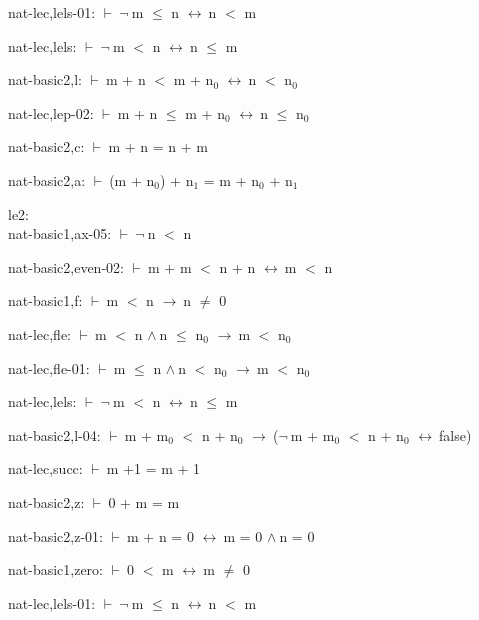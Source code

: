 \documentclass[a4paper]{article}
\newcommand{\Fol}{\mbox{$\vdash\ $}}
\newcommand{\Not}{\mbox{$\neg\ $}}
\newcommand{\And}{\mbox{$\wedge\ $}}
\newcommand{\Imp}{\mbox{$\rightarrow\ $}}
\newcommand{\Equiv}{\mbox{$\leftrightarrow\ $}}
\begin{document}
nat-lec,lels-01: 
 \Fol \Not m $\le$ n \Equiv n $<$ m



nat-lec,lels: 
 \Fol \Not m $<$ n \Equiv n $\le$ m



nat-basic2,l: 
 \Fol m + n $<$ m + $\mbox{n}_{0}$ \Equiv n $<$ $\mbox{n}_{0}$



nat-lec,lep-02: 
 \Fol m + n $\le$ m + $\mbox{n}_{0}$ \Equiv n $\le$ $\mbox{n}_{0}$



nat-basic2,c: 
 \Fol m + n = n + m



nat-basic2,a: 
 \Fol (m + $\mbox{n}_{0}$) + $\mbox{n}_{1}$ = m + $\mbox{n}_{0}$ + $\mbox{n}_{1}$



\bigskip

le2:\\ nat-basic1,ax-05: 
 \Fol \Not n $<$ n



nat-basic2,even-02: 
 \Fol m + m $<$ n + n \Equiv m $<$ n



nat-basic1,f: 
 \Fol m $<$ n \Imp n $\neq$ 0



nat-lec,fle: 
 \Fol m $<$ n \And n $\le$ $\mbox{n}_{0}$ \Imp m $<$ $\mbox{n}_{0}$



nat-lec,fle-01: 
 \Fol m $\le$ n \And n $<$ $\mbox{n}_{0}$ \Imp m $<$ $\mbox{n}_{0}$



nat-lec,lels: 
 \Fol \Not m $<$ n \Equiv n $\le$ m



nat-basic2,l-04: 
 \Fol m + $\mbox{m}_{0}$ $<$ n + $\mbox{n}_{0}$ \Imp (\Not m + $\mbox{m}_{0}$ $<$ n + $\mbox{n}_{0}$ \Equiv false)



nat-lec,succ: 
 \Fol m +1 = m + 1



nat-basic2,z: 
 \Fol 0 + m = m



nat-basic2,z-01: 
 \Fol m + n = 0 \Equiv m = 0 \And n = 0



nat-basic1,zero: 
 \Fol 0 $<$ m \Equiv m $\neq$ 0



nat-lec,lels-01: 
 \Fol \Not m $\le$ n \Equiv n $<$ m
\end{document}
